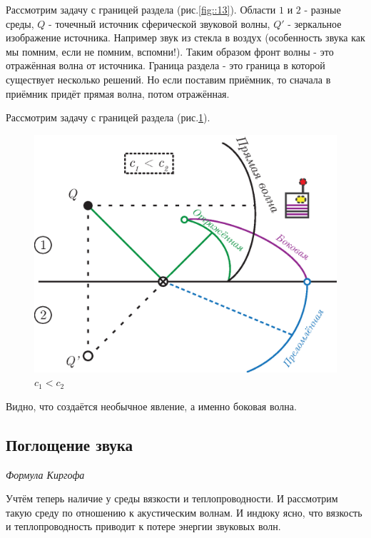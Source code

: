 \documentclass[14pt,a4paper,oneside]{extarticle}	%
\begin{document}
Рассмотрим задачу с границей раздела (рис.\ref{fig::13}).
Области $ 1 $ и $ 2 $ - разные среды, $ Q $ - точечный источник сферической звуковой волны, $ Q' $ - зеркальное изображение источника.
Например звук из стекла в воздух (особенность звука как мы помним, если не помним, вспомни!).
Таким образом фронт волны - это отражённая волна от источника.
Граница раздела  - это граница в которой существует несколько решений.
Но если поставим приёмник, то сначала в приёмник придёт прямая волна, потом отражённая.

Рассмотрим задачу с границей раздела (рис.\ref{fig::14}).
\begin{figure}[h!] 	%
	\centering 		%
	\includegraphics[width=14cm]{13.eps} %
	\caption{$ c_{1} < c_{2} $}
	\label{fig::14}
\end{figure}
Видно, что создаётся необычное явление, а именно боковая волна.

\begin{center}
	\subsection*{Поглощение звука} %
	\textit{ Формула Киргофа }
\end{center}

Учтём теперь наличие у среды вязкости и теплопроводности. И рассмотрим такую среду по отношению к акустическим волнам.
И индюку ясно, что вязкость и теплопроводность приводит к потере энергии звуковых волн.
\end{document}
